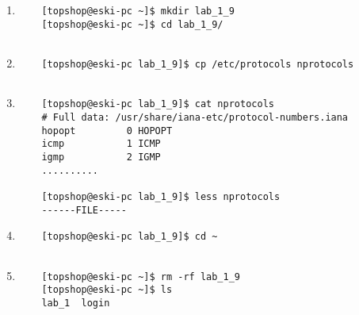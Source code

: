 \documentclass{article}
\begin{document}
\begin{enumerate}
\begin{verbatim}
	\end{verbatim}
	\item \begin{verbatim}
	[topshop@eski-pc ~]$ mkdir lab_1_9
	[topshop@eski-pc ~]$ cd lab_1_9/
	
	\end{verbatim}
	\item \begin{verbatim}
	[topshop@eski-pc lab_1_9]$ cp /etc/protocols nprotocols
	
	\end{verbatim}
	\item \begin{verbatim}
	[topshop@eski-pc lab_1_9]$ cat nprotocols 
	# Full data: /usr/share/iana-etc/protocol-numbers.iana
	hopopt         0 HOPOPT
	icmp           1 ICMP
	igmp           2 IGMP
	..........
	 
	[topshop@eski-pc lab_1_9]$ less nprotocols
	------FILE-----
	\end{verbatim}
	\item \begin{verbatim}
	[topshop@eski-pc lab_1_9]$ cd ~
	
	\end{verbatim}
	\item \begin{verbatim}
	[topshop@eski-pc ~]$ rm -rf lab_1_9
	[topshop@eski-pc ~]$ ls 
	lab_1  login
	
	\end{verbatim}
\end{enumerate}
\end{document}
